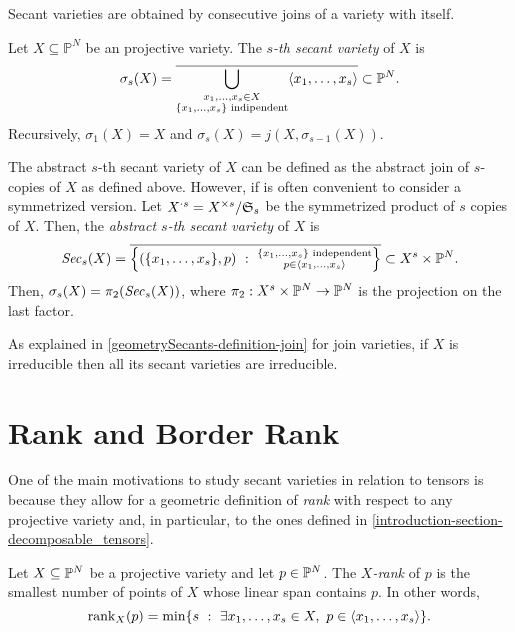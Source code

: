  Secant varieties are obtained by consecutive joins of a variety with itself.
 \begin{definition}
 \label{geometrySecants-definition-secantvariety}
 Let $X \subseteq \mathbb{P}^N$ be an projective variety. The {\it $s$-th secant variety} of $X$ is 
 \[
 \sigma_s(X) = \overline{\bigcup_{\substack{x_1,\ldots,x_s \in X \\ \{x_1,\ldots,x_s\} \text{ indipendent}}} \langle x_1,\ldots,x_s \rangle} \subset \mathbb{P}^N.
 \]
 Recursively, $\sigma_1(X) = X$ and $\sigma_s(X) = j(X,\sigma_{s-1}(X))$.
 
 The abstract $s$-th secant variety of $X$ can be defined as the abstract join of $s$-copies of $X$ as defined above. However, if is often convenient to consider a symmetrized version. Let $X^{\cdot s} = X^{\times s} / \mathfrak{S}_s$ be the symmetrized product of $s$ copies of $X$. Then, the {\it abstract $s$-th secant variety} of $X$ is 
 \[
     \mathit{Sec}_s(X) = \overline{\left\{(\{x_1,\ldots,x_s\},p) ~:~ \substack{\{x_1,\ldots,x_s\} \text{ independent} \\ p \in \langle x_1,\ldots,x_s \rangle}\right\}} \subset X^s \times \mathbb{P}^N.
 \]
 Then, $\sigma_s(X) = \pi_2(\mathit{Sec}_s(X))$, where $\pi_2 : X^s \times \mathbb{P}^N \rightarrow \mathbb{P}^N$ is the projection on the last factor.

 As explained in \ref{geometrySecants-definition-join} for join varieties, if $X$ is irreducible then all its secant varieties are irreducible.  
 \end{definition}
 
 \section{Rank and Border Rank}
 \label{geometrySecants-section-rank}
 
 One of the main motivations to study secant varieties in relation to tensors is because they allow for a geometric definition of {\it rank} with respect to any projective variety and, in particular, to the ones defined in \ref{introduction-section-decomposable_tensors}.
 
 \begin{definition}
 \label{geometrySecants-definition-Xrank}
     Let $X \subseteq \mathbb{P}^N$ be a projective variety and let $p \in \mathbb{P}^N$. The \emph{$X$-rank} of $p$ is the smallest number of points of $X$ whose linear span contains $p$. In other words,
     \[
         \mathrm{rank}_X(p) = \min\{s ~:~ \exists x_1,\ldots,x_s \in X, ~ p \in \langle x_1,\ldots,x_s \rangle\}.
     \]
 \end{definition}
 
